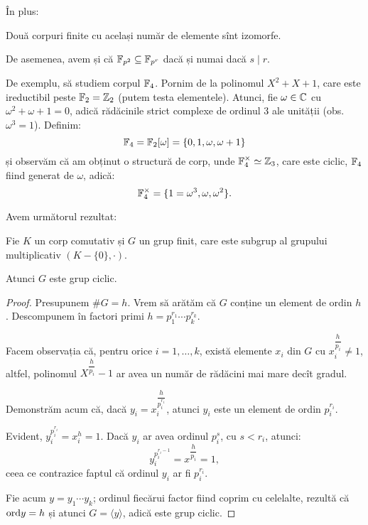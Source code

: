 În plus:
\begin{theorem}\label{thm:corp-fin-iso}
  Două corpuri finite cu același număr de elemente sînt izomorfe.

  De asemenea, avem și că $ \mathbb{F}_{p^2} \subseteq \mathbb{F}_{p^r} $
  dacă și numai dacă $ s \mid r $.
\end{theorem}

De exemplu, să studiem corpul $ \mathbb{F}_4 $. Pornim de la polinomul $ X^2 + X + 1 $,
care este ireductibil peste $ \mathbb{F}_2 = \mathbb{Z}_2 $ (putem testa elementele).
Atunci, fie $ \omega \in \mathbb{C} $ cu $ \omega^2 + \omega + 1 = 0 $, adică rădăcinile
strict complexe de ordinul 3 ale unității (obs.\ $ \omega^3 = 1 $).
Definim:
\[
  \mathbb{F}_4 = \mathbb{F}_2[\omega] = \{ 0, 1, \omega, \omega + 1 \}
\]
și observăm că am obținut o structură de corp, unde $ \mathbb{F}_4^{\times} \simeq \mathbb{Z}_3 $,
care este ciclic, $ \mathbb{F}_4 $ fiind generat de $ \omega $, adică:
\[
  \mathbb{F}_4^{\times} = \{ 1 = \omega^3, \omega, \omega^2 \}.
\]

Avem următorul rezultat:
\begin{theorem}\label{thm:gr-cic-corp}
  Fie $ K $ un corp comutativ și $ G $ un grup finit, care este subgrup
  al grupului multiplicativ $ (K - \{0\}, \cdot) $.

  Atunci $ G $ este grup ciclic.
\end{theorem}

\begin{proof}
  Presupunem $ \# G = h $. Vrem să arătăm că $ G $ conține un element de
  ordin $ h $. Descompunem în factori primi $ h = p_1^{r_1} \cdots p_k^{r_k} $.

  Facem observația că, pentru orice $ i = 1, \dots, k $, există elemente
  $ x_i $ din $ G $ cu $ x_i^{\dfrac{h}{p_i}} \neq 1 $, altfel, polinomul
  $ X^{\dfrac{h}{p_i}} - 1 $ ar avea un număr de rădăcini mai mare decît gradul.

  Demonstrăm acum că, dacă $ y_i = x_i^{\dfrac{h}{p_i^{r_i}}} $, atunci $ y_i $
  este un element de ordin $ p_i^{r_i} $.

  Evident, $ y_i^{p_i^{r_i}} = x_i^h = 1 $. Dacă $ y_i $ ar avea ordinul
  $ p_i^s $, cu $ s < r_i $, atunci:
  \[
    y_i^{p_i^{r_i - 1}} = x^{\dfrac{h}{p_i}} = 1,
  \]
  ceea ce contrazice faptul că ordinul $ y_i $ ar fi $ p_i^{r_i} $.

  Fie acum $ y = y_1 \cdots y_k $; ordinul fiecărui factor fiind coprim
  cu celelalte, rezultă că $ \mathrm{ord}y = h $ și atunci $ G = \langle y \rangle $,
  adică este grup ciclic.
\end{proof}

